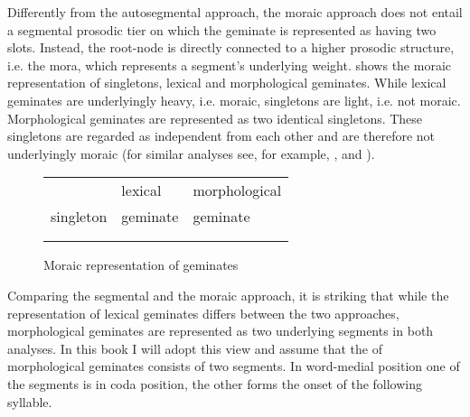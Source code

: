 Differently from the autosegmental approach, the moraic approach does not entail a segmental prosodic tier on which the geminate is represented as having two slots. Instead, the root-node is directly connected to a higher prosodic structure, i.e. the mora, which represents a segment's underlying weight.  shows the {moraic representation} of singletons, lexical and  morphological geminates. While  lexical geminates are underlyingly heavy, i.e. moraic, singletons are light, i.e. not moraic. Morphological geminates are represented as two identical singletons. These singletons are regarded as independent from each other and are therefore not underlyingly moraic  (for similar analyses see, for example,  \citealt[14]{Ham.2001}, \citealt[17]{Davis.2014} and \citealt{Davis.2017}).


\begin{figure} [h]
	\centering
	
	
	\begin{tabularx}{.8\linewidth}{YYY}
		
		&		lexical			 & 		 morphological \\
		
		singleton	&			  geminate	 & 			  geminate\\		
		\\
		\begin{tikzpicture}
		\Tree [.C  ] 					
		\end{tikzpicture}												&
		
		
		\begin{tikzpicture}[grow'=up]
		\Tree  [.C $\mu$ ]
		\end{tikzpicture}			
		&
		
		\begin{tikzpicture}[grow'=up]
		\Tree  [.C ]
		\end{tikzpicture}
		\begin{tikzpicture}[grow'=up]
		\Tree  [.C  ]
		\end{tikzpicture}		
		
	\end{tabularx}
	
	\caption{Moraic representation of geminates} 
	\label{fig:Moraic representation of geminates}
\end{figure}


Comparing the segmental and the moraic approach, it is striking that while the representation of  lexical geminates differs between the two approaches,  morphological geminates are represented as two underlying segments in both analyses.
In this book I will adopt this view and assume that the  of  morphological geminates consists of two segments. In word-medial position one of the segments is in coda position, the other forms the onset of the following syllable. 


